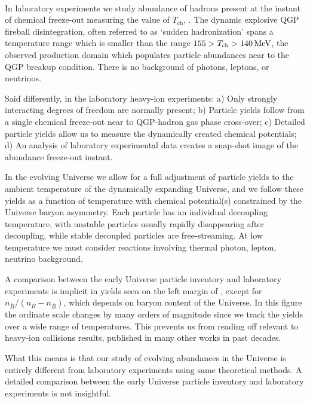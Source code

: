 {\color{blue}
\\
In laboratory experiments we study abundance of hadrons present at the instant of chemical freeze-out measuring the value of $T_\mathrm{ch}$, . The dynamic explosive QGP fireball disintegration, often referred to as `sudden hadronization' spans a temperature range which is smaller than the range $155>T_\mathrm{ch}>140\text{\,MeV}$, the observed production domain which populates particle abundances near to the QGP breakup condition. There is no background of photons, leptons, or neutrinos. 

Said differently, in the laboratory heavy-ion experiments: a) Only strongly interacting degrees of freedom are normally present; b) Particle yields follow from a single chemical freeze-out near to QGP-hadron gas phase cross-over; c) Detailed particle yields allow us to measure the dynamically created chemical potentials; d) An analysis of laboratory experimental data creates a snap-shot image of the abundance freeze-out instant.

In the evolving Universe  we allow for a full adjustment of particle yields to the ambient temperature of the dynamically expanding Universe, and we follow these yields as a function of temperature with chemical potential(s) constrained by the Universe baryon asymmetry. Each particle
has an individual decoupling temperature, with unstable particles usually rapidly disappearing after decoupling, while stable decoupled particles are free-streaming. At low temperature we must consider reactions involving thermal photon, lepton, neutrino background.

A comparison between the early Universe particle inventory and laboratory experiments is implicit in yields seen on the left margin of , except for $n_{\overline{B}}/(n_B-n_{\overline{B}})$, which depends on baryon content of the Universe. In this figure the ordinate scale changes by many orders of magnitude since we track the yields over a wide range of temperatures. This prevents us from reading off relevant to heavy-ion collisions results, published in many  other works in past decades.

What this means is that our study of evolving abundances in the Universe is entirely different from laboratory experiments  using same theoretical methods. A detailed comparison between the early Universe particle inventory and laboratory experiments is not insightful.
}
